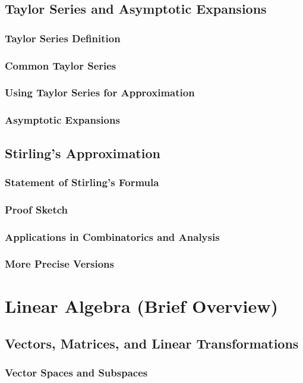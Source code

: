 \subsection{Taylor Series and Asymptotic Expansions}
\subsubsection{Taylor Series Definition}
\subsubsection{Common Taylor Series}
\subsubsection{Using Taylor Series for Approximation}
\subsubsection{Asymptotic Expansions}

\subsection{Stirling's Approximation}
\subsubsection{Statement of Stirling's Formula}
\subsubsection{Proof Sketch}
\subsubsection{Applications in Combinatorics and Analysis}
\subsubsection{More Precise Versions}

\section{Linear Algebra (Brief Overview)}
\subsection{Vectors, Matrices, and Linear Transformations}
\subsubsection{Vector Spaces and Subspaces}
